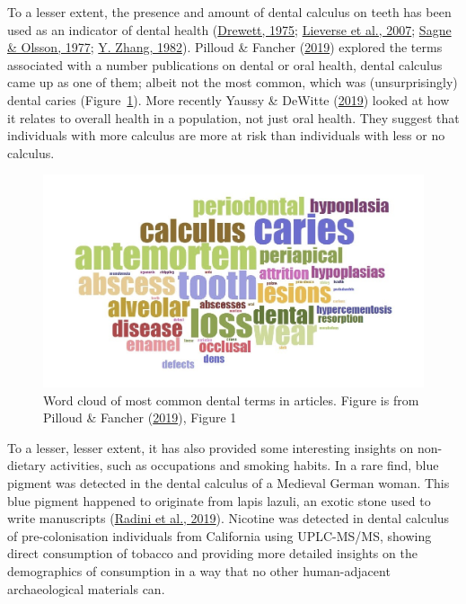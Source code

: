 \documentclass[
  letterpaper,
]{book}
\begin{document}
To a lesser extent, the presence and amount of dental calculus on teeth
has been used as an indicator of dental health
(\protect\hyperlink{ref-drewettExcavationOval1975}{Drewett, 1975};
\protect\hyperlink{ref-lieverseDentalHealth2007}{Lieverse et al., 2007};
\protect\hyperlink{ref-sagneStudiesPeriodontal1977}{Sagne \& Olsson,
1977}; \protect\hyperlink{ref-zhangDentalDisease1982}{Y. Zhang, 1982}).
Pilloud \& Fancher
(\protect\hyperlink{ref-pilloudOutliningDefinition2019}{2019}) explored
the terms associated with a number publications on dental or oral
health, dental calculus came up as one of them; albeit not the most
common, which was (unsurprisingly) dental caries
(Figure~\ref{fig-dental-terms}). More recently Yaussy \& DeWitte
(\protect\hyperlink{ref-yaussyCalculusSurvivorship2019}{2019}) looked at
how it relates to overall health in a population, not just oral health.
They suggest that individuals with more calculus are more at risk than
individuals with less or no calculus.

\begin{figure}

{\centering \includegraphics{figures/wordcloud.png}

}

\caption{\label{fig-dental-terms}Word cloud of most common dental terms
in articles. Figure is from Pilloud \& Fancher
(\protect\hyperlink{ref-pilloudOutliningDefinition2019}{2019}), Figure
1}

\end{figure}

To a lesser, lesser extent, it has also provided some interesting
insights on non-dietary activities, such as occupations and smoking
habits. In a rare find, blue pigment was detected in the dental calculus
of a Medieval German woman. This blue pigment happened to originate from
lapis lazuli, an exotic stone used to write manuscripts
(\protect\hyperlink{ref-radiniMedievalWomen2019}{Radini et al., 2019}).
Nicotine was detected in dental calculus of pre-colonisation individuals
from California using UPLC-MS/MS, showing direct consumption of tobacco
and providing more detailed insights on the demographics of consumption
in a way that no other human-adjacent archaeological materials can.
\end{document}
